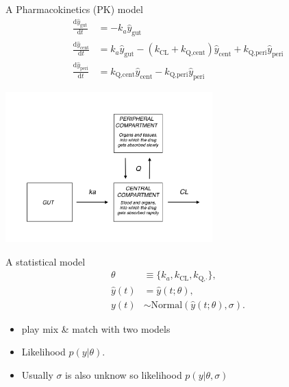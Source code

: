 \documentclass[bigger]{beamer}
\begin{document}
\begin{frame}[label={sec:org0a93c14}]{A Pharmacokinetics (PK) model}
\begin{align*}
  \frac{\mathrm d \hat{y}_\mathrm{gut}}{\mathrm d t} & = - k_a \hat{y}_\mathrm{gut} \\
  \frac{\mathrm d \hat{y}_\mathrm{cent}}{\mathrm d t} & = k_a \hat{y}_\mathrm{gut} -\left (k_{\text{CL}} + k_{\text{Q,cent}} \right) \hat{y}_\mathrm{cent} + k_{\text{Q,peri}} \hat{y}_\mathrm{peri} \\
  \frac{\mathrm d \hat{y}_\mathrm{peri}}{\mathrm d t} & = k_{\text{Q,cent}} \hat{y}_\mathrm{cent} - k_{\text{Q,peri}} \hat{y}_\mathrm{peri}
\end{align*}

\begin{center}
\includegraphics[width=0.6\textwidth]{./figure/TwoCptNice.png}
\end{center}
\end{frame}

\begin{frame}[label={sec:org61a1ab0}]{A statistical model}
\begin{align*}
\theta & \equiv \{k_a, k_{\text{CL}}, k_{\text{Q,}\cdot}\},\\
\hat{y}(t) & = \hat{y}(t;\theta),\\
y(t) &\sim \text{Normal}(\hat{y}(t;\theta), \sigma).
\end{align*}

\begin{itemize}
\item play mix \& match with two models
\item Likelihood \(p(y | \theta)\).
\item Usually \(\sigma\) is also unknow so likelihood \(p(y | \theta, \sigma)\)
\end{itemize}
\end{frame}
\end{document}
